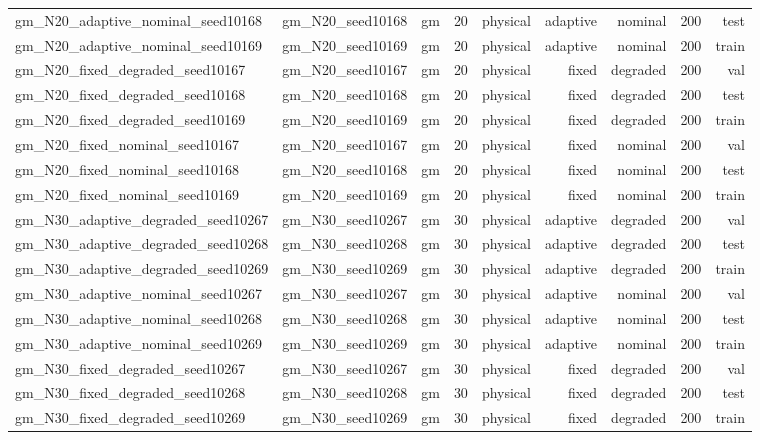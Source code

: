\begin{tabular}{lrrrrrrrr}
gm\_N20\_adaptive\_nominal\_seed10168 & gm\_N20\_seed10168 & gm & 20 & physical & adaptive & nominal & 200 & test \\
gm\_N20\_adaptive\_nominal\_seed10169 & gm\_N20\_seed10169 & gm & 20 & physical & adaptive & nominal & 200 & train \\
gm\_N20\_fixed\_degraded\_seed10167 & gm\_N20\_seed10167 & gm & 20 & physical & fixed & degraded & 200 & val \\
gm\_N20\_fixed\_degraded\_seed10168 & gm\_N20\_seed10168 & gm & 20 & physical & fixed & degraded & 200 & test \\
gm\_N20\_fixed\_degraded\_seed10169 & gm\_N20\_seed10169 & gm & 20 & physical & fixed & degraded & 200 & train \\
gm\_N20\_fixed\_nominal\_seed10167 & gm\_N20\_seed10167 & gm & 20 & physical & fixed & nominal & 200 & val \\
gm\_N20\_fixed\_nominal\_seed10168 & gm\_N20\_seed10168 & gm & 20 & physical & fixed & nominal & 200 & test \\
gm\_N20\_fixed\_nominal\_seed10169 & gm\_N20\_seed10169 & gm & 20 & physical & fixed & nominal & 200 & train \\
gm\_N30\_adaptive\_degraded\_seed10267 & gm\_N30\_seed10267 & gm & 30 & physical & adaptive & degraded & 200 & val \\
gm\_N30\_adaptive\_degraded\_seed10268 & gm\_N30\_seed10268 & gm & 30 & physical & adaptive & degraded & 200 & test \\
gm\_N30\_adaptive\_degraded\_seed10269 & gm\_N30\_seed10269 & gm & 30 & physical & adaptive & degraded & 200 & train \\
gm\_N30\_adaptive\_nominal\_seed10267 & gm\_N30\_seed10267 & gm & 30 & physical & adaptive & nominal & 200 & val \\
gm\_N30\_adaptive\_nominal\_seed10268 & gm\_N30\_seed10268 & gm & 30 & physical & adaptive & nominal & 200 & test \\
gm\_N30\_adaptive\_nominal\_seed10269 & gm\_N30\_seed10269 & gm & 30 & physical & adaptive & nominal & 200 & train \\
gm\_N30\_fixed\_degraded\_seed10267 & gm\_N30\_seed10267 & gm & 30 & physical & fixed & degraded & 200 & val \\
gm\_N30\_fixed\_degraded\_seed10268 & gm\_N30\_seed10268 & gm & 30 & physical & fixed & degraded & 200 & test \\
gm\_N30\_fixed\_degraded\_seed10269 & gm\_N30\_seed10269 & gm & 30 & physical & fixed & degraded & 200 & train \\

\end{tabular}
